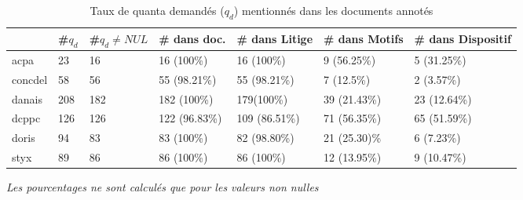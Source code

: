 \begin{table}[!htb]
	\scriptsize
	\begin{tabular}{|l|l|l|l|l|l|l|}
		\hline
		& \textbf{\#$q_d$} & \textbf{\#$q_d\neq NUL$} & \textbf{\# dans doc.} & \textbf{\# dans Litige} & \textbf{\# dans Motifs} & \textbf{\# dans Dispositif} \\ \hline
		acpa               & 23                   & 16                                           & 16 (100\%)                   & 16 (100\%)              & 9 (56.25\%)             & 5 (31.25\%)                 \\ \hline
		concdel            & 58                   & 56                                           & 55 (98.21\%)                 & 55 (98.21\%)            & 7 (12.5\%)              & 2 (3.57\%)                  \\ \hline
		danais             & 208                  & 182                                          & 182 (100\%)                  & 179(100\%)              & 39 (21.43\%)            & 23 (12.64\%)                \\ \hline
		dcppc              & 126                  & 126                                          & 122 (96.83\%)                & 109 (86.51\%)           & 71 (56.35\%)            & 65 (51.59\%)                \\ \hline
		doris              & 94                   & 83                                           & 83 (100\%)                   & 82 (98.80\%)            & 21 (25.30)\%            & 6 (7.23\%)                  \\ \hline
		styx               & 89                   & 86                                           & 86 (100\%)                   & 86 (100\%)              & 12 (13.95\%)            & 9 (10.47\%)                 \\ \hline
	\end{tabular}
	\textit{Les pourcentages ne sont calculés que pour les valeurs non nulles}
	\caption{Taux de quanta demandés ($q_d$) mentionnés dans les documents annotés} \label{tab:quanta:mentionQd}
\end{table}

